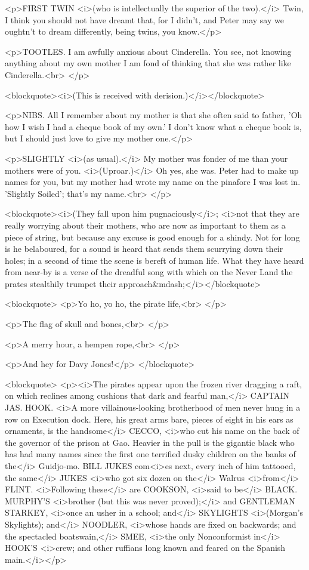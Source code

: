 <p>FIRST TWIN <i>(who is intellectually the superior of the two).</i>
Twin, I think you should not have dreamt that, for I didn't, and
Peter may say we oughtn't to dream differently, being twins, you
know.</p>

<p>TOOTLES. I am awfully anxious about Cinderella. You see, not
knowing anything about my own mother I am fond of thinking that she
was rather like Cinderella.<br>
</p>

<blockquote><i>(This is received with derision.)</i></blockquote>

<p>NIBS. All I remember about my mother is that she often said to
father, 'Oh how I wish I had a cheque book of my own.' I don't know
what a cheque book is, but I should just love to give my mother
one.</p>

<p>SLIGHTLY <i>(as usual).</i> My mother was fonder of me than your
mothers were of you. <i>(Uproar.)</i> Oh yes, she was. Peter had to
make up names for you, but my mother had wrote my name on the
pinafore I was lost in. 'Slightly Soiled'; that's my name.<br>
</p>

<blockquote><i>(They fall upon him pugnaciously</i>; <i>not that they
are really worrying about their mothers, who are now as important to
them as a piece of string, but because any excuse is good enough for
a shindy. Not for long is he belaboured, for a sound is heard that
sends them scurrying down their holes; in a second of time the scene
is bereft of human life. What they have heard from near-by is a verse
of the dreadful song with which on the Never Land the prates
stealthily trumpet their approach&mdash;</i></blockquote>

<blockquote>
<p>Yo ho, yo ho, the pirate life,<br>
</p>

<p>The flag of skull and bones,<br>
</p>

<p>A merry hour, a hempen rope,<br>
</p>

<p>And hey for Davy Jones!</p>
</blockquote>

<blockquote>
<p><i>The pirates appear upon the frozen river dragging a raft, on
which reclines among cushions that dark and fearful man,</i> CAPTAIN
JAS. HOOK. <i>A more villainous-looking brotherhood of men never hung
in a row on Execution dock. Here, his great arms bare, pieces of
eight in his ears as ornaments, is the handsome</i> CECCO, <i>who cut
his name on the back of the governor of the prison at Gao. Heavier in
the pull is the gigantic black who has had many names since the first
one terrified dusky children on the banks of the</i> Guidjo-mo. BILL
JUKES com<i>es next, every inch of him tattooed, the same</i> JUKES
<i>who got six dozen on the</i> Walrus <i>from</i> FLINT.
<i>Following these</i> are COOKSON, <i>said to be</i> BLACK. MURPHY'S
<i>brother (but this was never proved);</i> and GENTLEMAN STARKEY,
<i>once an usher in a school; and</i> SKYLIGHTS <i>(Morgan's
Skylights); and</i> NOODLER, <i>whose hands are fixed on backwards;
and the spectacled boatswain,</i> SMEE, <i>the only Nonconformist
in</i> HOOK'S <i>crew; and other ruffians long known and feared on
the Spanish main.</i></p>

